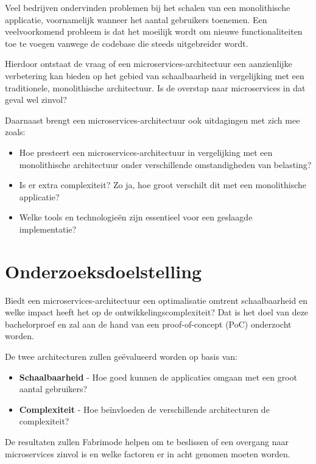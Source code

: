 Veel bedrijven ondervinden problemen bij het schalen van een monolithische applicatie, voornamelijk wanneer het aantal gebruikers toenemen. Een veelvoorkomend probleem is dat het moeilijk wordt om nieuwe functionaliteiten toe te voegen vanwege de codebase die steeds uitgebreider wordt.

Hierdoor ontstaat de vraag of een microservices-architectuur een aanzienlijke verbetering kan bieden op het gebied van schaalbaarheid in vergelijking met een traditionele, monolithische architectuur. Is de overstap naar microservices in dat geval wel zinvol?

Daarnaast brengt een microservices-architectuur ook uitdagingen met zich mee zoals:

\begin{itemize}
	\item Hoe presteert een microservices-architectuur in vergelijking met een monolithische architectuur onder verschillende omstandigheden van belasting?
	\item Is er extra complexiteit? Zo ja, hoe groot verschilt dit met een monolithische applicatie?
	\item Welke tools en technologieën zijn essentieel voor een geslaagde implementatie?
\end{itemize}

\section{Onderzoeksdoelstelling}

Biedt een microservices-architectuur een optimalisatie omtrent schaalbaarheid en welke impact heeft het op de ontwikkelingscomplexiteit? Dat is het doel van deze bachelorproef en zal aan de hand van een proof-of-concept (PoC) onderzocht worden.

De twee architecturen zullen geëvalueerd worden op basis van:

\begin{itemize}
	\item \textbf{Schaalbaarheid} - Hoe goed kunnen de applicaties omgaan met een groot aantal gebruikers?
	\item \textbf{Complexiteit} - Hoe beïnvloeden de verschillende architecturen de complexiteit?
\end{itemize}

De resultaten zullen Fabrimode helpen om te beslissen of een overgang naar microservices zinvol is en welke factoren er in acht genomen moeten worden.

